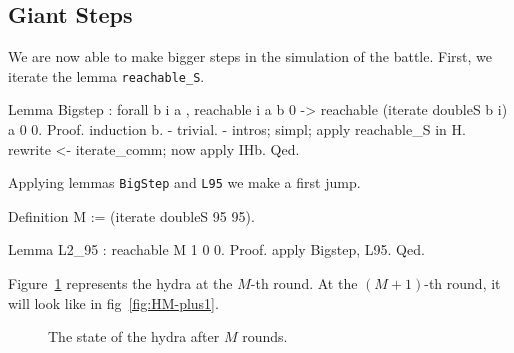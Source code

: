 \subsection{Giant Steps}

We are now able to make bigger steps in the simulation of the battle.
First, we iterate the lemma \texttt{reachable\_S}.

\begin{Coqsrc}
Lemma Bigstep : forall b i a , reachable i a b 0 ->
                               reachable (iterate doubleS b i) a 0 0.
 Proof.
  induction b.
  -  trivial.
  -  intros;  simpl;   apply reachable_S in H.
     rewrite <- iterate_comm; now apply IHb.
 Qed.
\end{Coqsrc}

Applying lemmas \texttt{BigStep} and \texttt{L95} we make a first jump.


\begin{Coqsrc}
 Definition M := (iterate doubleS 95 95).

Lemma L2_95 : reachable M 1 0 0.
Proof.
  apply Bigstep,  L95.
Qed.
\end{Coqsrc}

Figure~\ref{fig:HM}  represents the hydra at the $M$-th round.
At the $(M+1)$-th round, it will look like in fig~\ref{fig:HM-plus1}.





\begin{figure}[htb]
\centering
{}
\caption{\label{fig:HM}}
The state of the hydra after $M$ rounds.

\end{figure}


